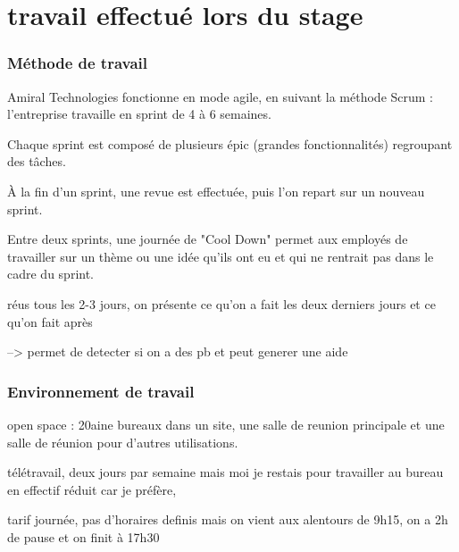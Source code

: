 \section{travail effectué lors du stage}
\subsubsection{Méthode de travail}
Amiral Technologies fonctionne en mode agile, en suivant la méthode Scrum : l’entreprise travaille en sprint de 4 à 6 semaines.

Chaque sprint est composé de plusieurs épic (grandes fonctionnalités) regroupant des tâches.

À la fin d’un sprint, une revue est effectuée, puis l’on repart sur un nouveau sprint.

Entre deux sprints, une journée de "Cool Down" permet aux employés de travailler sur un thème ou une idée qu’ils ont eu et qui ne rentrait pas
dans le cadre du sprint.

réus tous les 2-3 jours, on présente ce qu'on a fait les deux derniers jours et ce qu'on fait après 

--> permet de detecter si on a des pb et peut generer une aide 

\subsubsection{Environnement de travail}
open space : 20aine bureaux dans un site, une salle de reunion principale et une salle de réunion pour d'autres utilisations.

télétravail, deux jours par semaine mais moi je restais pour travailler au bureau en effectif réduit car je préfère,

tarif journée, pas d'horaires definis mais on vient aux alentours de 9h15, on a 2h de pause et on finit à 17h30
